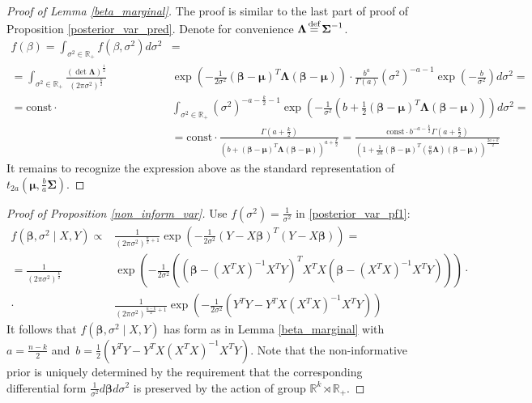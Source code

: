 \documentclass[10pt,fleqn]{amsart}
\theoremstyle{definition}
\theoremstyle{remark}
\numberwithin{equation}{section}
\newcommand{\RR}{\mathbb{R}}
\newcommand{\eq}{\stackrel{\mathclap{\normalfont\text{def}}}{=}}
\newcommand{\const}{\text{const}}
\newcommand{\bbeta}{\boldsymbol{\beta}}
\newcommand{\mmu}{\boldsymbol{\mu}}
\newcommand{\SSigma}{\boldsymbol{\Sigma}}
\newcommand{\LLambda}{\boldsymbol{\Lambda}}
\newcommand{\XTX}{X^TX}
\newcommand{\XTY}{X^TY}
\newcommand{\YTX}{Y^TX}
\newcommand{\YTY}{Y^TY}
\newcommand{\XTXi}{\left(X^TX\right)^{-1}}
\begin{document}
\begin{proof}[Proof of Lemma \ref{beta_marginal}]
The proof is similar to the last part of proof of Proposition \ref{posterior_var_pred}. Denote for convenience $\LLambda\eq\SSigma^{-1}$.
\begin{equation*}
    \begin{split}
        f(\beta)=\int_{\sigma^2\in\RR_+}f\left(\beta,\sigma^2\right)d\sigma^2&=\\
        =\int_{\sigma^2\in\RR_+}\frac{\left(\det\LLambda\right)^{\frac 12}}{\left(2\pi\sigma^2\right)^{\frac k2}}&
        \exp\left(-\frac 1{2\sigma^2}(\bbeta-\mmu)^T\LLambda(\bbeta-\mmu)\right)\cdot\frac{{b}^{a}}
        {\Gamma(a)}\left(\sigma^2\right)^{-a-1}\exp\left(-\frac{b}{\sigma^2}\right)d\sigma^2=\\
        =\const\cdot&\int_{\sigma^2\in\RR_+}\left(\sigma^2\right)^{-a-\frac k 2 -1}\exp\left(-\frac 1{\sigma^2}
        \left(b+\frac 12(\bbeta-\mmu)^T\LLambda(\bbeta-\mmu)\right)\right)d\sigma^2=\\
        &=\const\cdot \frac{\Gamma{\left(a+\frac k 2\right)}}{\left(b+(\bbeta-\mmu)^T\LLambda(\bbeta-\mmu)\right)^{a+\frac k 2}}=
        \frac{\const \cdot b^{-a-\frac k2}\Gamma{\left(a+\frac k 2\right)}}{\left(1+\frac 1{2a}(\bbeta-\mmu)^T\left(\frac ab\LLambda\right)(\bbeta-\mmu)\right)^{\frac {2a+k}2}}
    \end{split}
\end{equation*}
It remains to recognize the expression above as the standard representation of $t_{2a}\left(\mmu,\frac ba\SSigma\right)$.
\end{proof}
\begin{proof}[Proof of Proposition \ref{non_inform_var}]
Use $\displaystyle f(\sigma^2)=\frac 1 {\sigma^2}$ in \ref{posterior_var_pf1}:
\begin{equation*}
    \begin{split}
        f\left(\bbeta,\sigma^2\mid X,Y\right)\propto&\frac 1{\left(2\pi\sigma^2\right)^{\frac n 2+1}}
        \exp\left(-\frac 1{2\sigma^2}\left(Y-X\bbeta\right)^T\left(Y-X\bbeta\right)\right)=\\        
        =\frac 1{\left(2\pi\sigma^2\right)^{\frac k 2}}&
        \exp\left(-\frac 1{2\sigma^2}\left(\left(\bbeta-\XTXi\XTY\right)^T\XTX\left(\bbeta-\XTXi\XTY\right)\right)\right)\cdot \\
        \cdot&\frac 1{\left(2\pi\sigma^2\right)^{\frac {n-k}2+1}}
        \exp{\left(-\frac 1 {2\sigma^2}\left(\YTY-\YTX\XTXi\XTY \right)\right)}
    \end{split}
\end{equation*}
It follows that $f\left(\bbeta,\sigma^2\mid X,Y\right)$ has form as in Lemma \ref{beta_marginal}
with $\displaystyle a=\frac{n-k}2$ and~$\displaystyle b=\frac 12 \left(\YTY-\YTX\XTXi\XTY \right)$.
Note that the non-informative prior is uniquely determined by the requirement that the corresponding differential form
$\displaystyle \frac 1{\sigma^2}d\bbeta d\sigma^2$ is preserved by the action of group $\RR^k\rtimes \RR_+$.
\end{proof}
\end{document}
